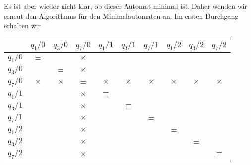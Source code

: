 \begin{loesung}
\begin{teilaufgaben}
Es ist aber wieder nicht klar, ob dieser Automat minimal ist. Daher
wenden wir erneut den Algorithmus für den Minimalautomaten an. Im
ersten Durchgang erhalten wir
\begin{center}
\begin{tabular}{|c|ccccccccc|}
\hline
         &$q_1/0$  &$q_3/0$  &$q_7/0$  &$q_1/1$  &$q_3/1$  &$q_7/1$  &$q_1/2$  &$q_3/2$  &$q_7/2$  \\
\hline
$q_1/0$  &$\equiv$ &         &$\times$ &         &         &         &         &         &         \\
$q_3/0$  &         &$\equiv$ &$\times$ &         &         &         &         &         &         \\
$q_7/0$  &$\times$ &$\times$ &$\equiv$ &$\times$ &$\times$ &$\times$ &$\times$ &$\times$ &$\times$ \\
$q_1/1$  &         &         &$\times$ &$\equiv$ &         &         &         &         &         \\
$q_3/1$  &         &         &$\times$ &         &$\equiv$ &         &         &         &         \\
$q_7/1$  &         &         &$\times$ &         &         &$\equiv$ &         &         &         \\
$q_1/2$  &         &         &$\times$ &         &         &         &$\equiv$ &         &         \\
$q_3/2$  &         &         &$\times$ &         &         &         &         &$\equiv$ &         \\
$q_7/2$  &         &         &$\times$ &         &         &         &         &         &$\equiv$ \\
\hline
\end{tabular}
\end{center}

\end{teilaufgaben}
\end{loesung}
